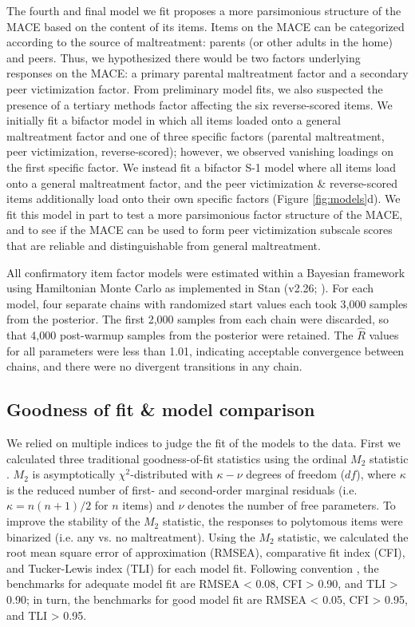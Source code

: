 \documentclass[letterpaper,man,natbib,noextraspace,floatsintext,longtable,12pt]{apa6}
\begin{document}
The fourth and final model we fit proposes a more parsimonious structure of the MACE based on the content of its items. Items on the MACE can be categorized according to the source of maltreatment: parents (or other adults in the home) and peers. Thus, we hypothesized there would be two factors underlying responses on the MACE: a primary parental maltreatment factor and a secondary peer victimization factor. From preliminary model fits, we also suspected the presence of a tertiary methods factor affecting the six reverse-scored items. We initially fit a bifactor model in which all items loaded onto a general maltreatment factor and one of three specific factors (parental maltreatment, peer victimization, reverse-scored); however, we observed vanishing loadings on the first specific factor. We instead fit a bifactor S-1 model where all items load onto a general maltreatment factor, and the peer victimization \& reverse-scored items additionally load onto their own specific factors (Figure \ref{fig:models}d). We fit this model in part to test a more parsimonious factor structure of the MACE, and to see if the MACE can be used to form peer victimization subscale scores that are reliable and distinguishable from general maltreatment. 

All confirmatory item factor models were estimated within a Bayesian framework using Hamiltonian Monte Carlo as implemented in Stan (v2.26; \citealt{carpenter2017stan}). For each model, four separate chains with randomized start values each took 3,000 samples from the posterior. The first 2,000 samples from each chain were discarded, so that 4,000 post-warmup samples from the posterior were retained. The $\hat{R}$ values for all parameters were less than 1.01, indicating acceptable convergence between chains, and there were no divergent transitions in any chain. 

\subsection{Goodness of fit \& model comparison}

We relied on multiple indices to judge the fit of the models to the data. First we calculated three traditional goodness-of-fit statistics using the ordinal $M_2$ statistic \citep{cai2013limited}. $M_2$ is asymptotically $\chi^2$-distributed with $\kappa − \nu$ degrees of freedom ($df$), where $\kappa$ is the reduced number of first- and second-order marginal residuals (i.e. $\kappa = n(n + 1)/2$ for $n$ items) and $\nu$ denotes the number of free parameters. To improve the stability of the $M_2$ statistic, the responses to polytomous items were binarized (i.e. any vs. no maltreatment). Using the $M_2$ statistic, we calculated the root mean square error of approximation (RMSEA), comparative fit index (CFI), and Tucker-Lewis index (TLI) for each model fit. Following convention \citep{hu1999cutoff}, the benchmarks for adequate model fit are RMSEA < 0.08, CFI > 0.90, and TLI > 0.90; in turn, the benchmarks for good model fit are RMSEA < 0.05, CFI > 0.95, and TLI > 0.95. 
\end{document}
